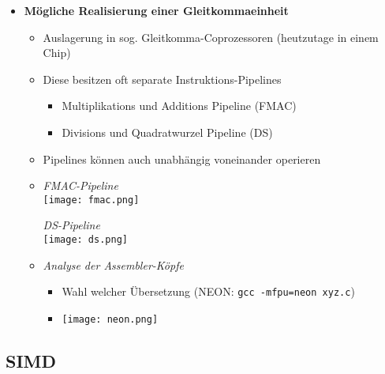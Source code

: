 \begin{itemize}
        \item \textbf{Mögliche Realisierung einer Gleitkommaeinheit}
            \begin{itemize}
                \item Auslagerung in sog. Gleitkomma-Coprozessoren (heutzutage in einem Chip)
                \item Diese besitzen oft separate Instruktions-Pipelines 
                    \begin{itemize}
                        \item Multiplikations und Additions Pipeline (FMAC)
                        \item Divisions und Quadratwurzel Pipeline (DS)
                    \end{itemize}
                \item Pipelines können auch unabhängig voneinander operieren
                \item[]
                    \begin{minipage}{0.45\textwidth}
                        \textit{FMAC-Pipeline} \\
                        \texttt{[image: fmac.png]}
                    \end{minipage}
                    \begin{minipage}{0.45\textwidth}
                        \textit{DS-Pipeline} \\
                        \texttt{[image: ds.png]}
                    \end{minipage}
                \item \textit{Analyse der Assembler-Köpfe}
                    \begin{itemize}
                        \item Wahl welcher Übersetzung (NEON: \texttt{gcc -mfpu=neon xyz.c})
                        \item[] \texttt{[image: neon.png]}
                    \end{itemize}
            \end{itemize}

    \end{itemize}

\subsection{SIMD}

